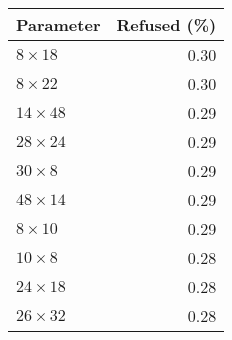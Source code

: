 \begin{tabular}{lr}
  \toprule
  Parameter & Refused (\%) \\
  \midrule
  $8 \times 18$ & 0.30 \\
  $8 \times 22$ & 0.30 \\
  $14 \times 48$ & 0.29 \\
  $28 \times 24$ & 0.29 \\
  $30 \times 8$ & 0.29 \\
  $48 \times 14$ & 0.29 \\
  $8 \times 10$ & 0.29 \\
  $10 \times 8$ & 0.28 \\
  $24 \times 18$ & 0.28 \\
  $26 \times 32$ & 0.28 \\
  \bottomrule
\end{tabular}

